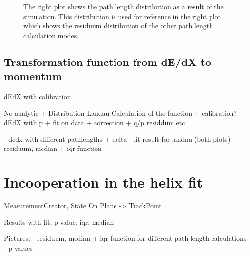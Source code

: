 
\begin{figure}
 \centering
 \caption{The right plot shows the path length distribution as a result of the simulation. This distribution is used for reference in the right plot which shows the residuum distribution of the other path length calculation modes.}
 \label{fig-pathlengths}
\end{figure}

\subsection{Transformation function from dE/dX to momentum}

dEdX with calibration

No analytic + Distribution
Landau
Calculation of the function + calibration?
dEdX with p + fit on data + correction + q/p residdum etc.

- dedx with different pathlengths + delta
- fit result for landau (both plots),
- residuum, median + iqr function

\section{Incooperation in the helix fit}

MeasurementCreator, State On Plane -> TrackPoint

Results with fit, p value, iqr, median

Pictures:
- residuum, median + iqr function for different path length calculations
- p values